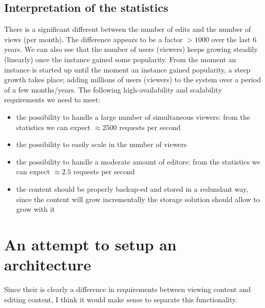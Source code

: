\documentclass[12pt]{report}
\begin{document}
\subsection{Interpretation of the statistics}
There is a significant different between the number of edits and the
number of views (per month).
The difference appears to be a factor $>1000$ over the last 6 years.
We can also see that the number of users (viewers) keeps growing
steadily (linearly) once the instance gained some popularity. 
From the moment an instance is started up until the moment an
instance gained popularity, a steep growth takes place; adding
millions of users (viewers) to the system over a period of a few
months/years.
The following high-availability and scalability requirements we need to meet:
\begin{itemize}
\item the possibility to handle a large number of
  simultaneous viewers: from the statistics we can expect $\approx 2500$
  requests per second
\item the possibility to easily scale in the number of viewers
\item the possibility to handle a moderate amount of editors: from the
  statistics we can expect $\approx 2.5$ requests per second
\item the content should be properly backup-ed and stored in a
  redundant way, since the content will grow incrementally the storage
  solution should allow to grow with it
\end{itemize}

\section{An attempt to setup an architecture}
Since their is clearly a difference in requirements between viewing content and
editing content, I think it would make sense to separate this
functionality.
\end{document}
